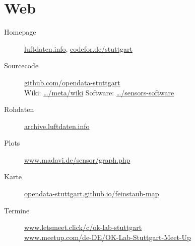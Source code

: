 \documentclass[
notumble,
]{leaflet}
\begin{document}
\section{Web}

\begin{description}

	\item[Homepage] \href{http://luftdaten.info/}{luftdaten.info}, \href{http://codefor.de/stuttgart/}{codefor.de/stuttgart}

	\item[Sourcecode] \href{https://github.com/opendata-stuttgart/}{github.com/opendata-stuttgart}
		\\Wiki: \href{https://github.com/opendata-stuttgart/meta/wiki}{\dots/meta/wiki}
		Software: \href{https://github.com/opendata-stuttgart/sensors-software}{\dots/sensors-software}

	\item[Rohdaten] \href{http://archive.luftdaten.info/}{archive.luftdaten.info}
	\item[Plots] \href{https://www.madavi.de/sensor/graph.php}{www.madavi.de/sensor/graph.php}
	\item[Karte] \href{https://opendata-stuttgart.github.io/feinstaub-map/}{opendata-stuttgart.github.io/feinstaub-map}
	\item[Termine] \href{https://www.letsmeet.click/c/ok-lab-stuttgart/}{www.letsmeet.click/c/ok-lab-stuttgart}
		\\\href{http://www.meetup.com/de-DE/OK-Lab-Stuttgart-Meet-Up/}{www.meetup.com/de-DE/OK-Lab-Stuttgart-Meet-Up}%
\end{description}

% 
% 
% 
\end{document}
